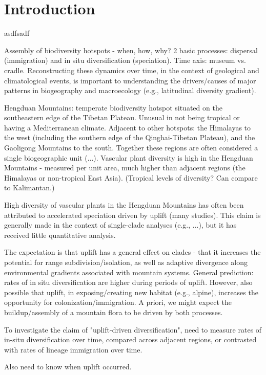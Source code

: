 \section{Introduction}

asdfsadf

Assembly of biodiversity hotspots - when, how, why? 2 basic processes: dispersal (immigration) and in situ diversification (speciation). Time axis: museum vs. cradle. Reconstructing these dynamics over time, in the context of geological and climatological events, is important to understanding the drivers/causes of major patterns in biogeography and macroecology (e.g., latitudinal diversity gradient).\cite{25041629}

Hengduan Mountains: temperate biodiversity hotspot situated on the southeastern edge of the Tibetan Plateau. Unusual in not being tropical or having a Mediterranean climate. Adjacent to other hotspots: the Himalayas to the west (including the southern edge of the Qinghai-Tibetan Plateau), and the Gaoligong Mountains to the south. Together these regions are often considered a single biogeographic unit (...). Vascular plant diversity is high in the Hengduan Mountains - measured per unit area, much higher than adjacent regions (the Himalayas or non-tropical East Asia). (Tropical levels of diversity? Can compare to Kalimantan.)

High diversity of vascular plants in the Hengduan Mountains has often been attributed to accelerated speciation driven by uplift (many studies). This claim is generally made in the context of single-clade analyses (e.g., ...), but it has received little quantitative analysis.

The expectation is that uplift has a general effect on clades - that it increases the potential for range subdivision/isolation, as well as adaptive divergence along environmental gradients associated with mountain systems. General prediction: rates of in situ diversification are higher during periods of uplift. However, also possible that uplift, in exposing/creating new habitat (e.g., alpine), increases the opportunity for colonization/immigration. A priori, we might expect the buildup/assembly of a mountain flora to be driven by both processes.

To investigate the claim of "uplift-driven diversification", need to measure rates of in-situ diversification over time, compared across adjacent regions, or contrasted with rates of lineage immigration over time.

Also need to know when uplift occurred.

